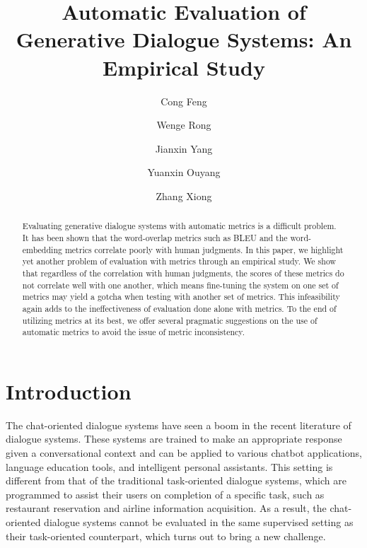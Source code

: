 \documentclass[runningheads]{llncs}
\begin{document}
    \title{Automatic Evaluation of Generative Dialogue Systems: An Empirical Study}
    \author{Cong Feng \and Wenge Rong \and Jianxin Yang  \and Yuanxin Ouyang  \and Zhang Xiong }

    \maketitle

    \begin{abstract}
        Evaluating generative dialogue systems with automatic metrics is a difficult problem. It has been shown that the word-overlap metrics such as BLEU and the word-embedding metrics correlate poorly with human judgments. In this paper, we highlight yet another problem of evaluation with metrics through an empirical study. We show that regardless of the correlation with human judgments, the scores of these metrics do not correlate well with one another, which means fine-tuning the system on one set of metrics may yield a gotcha when testing with another set of metrics. This infeasibility again adds to the ineffectiveness of evaluation done alone with metrics. To the end of utilizing metrics at its best, we offer several pragmatic suggestions on the use of automatic metrics to avoid the issue of metric inconsistency.
    \end{abstract}

    \section{Introduction}
    The chat-oriented dialogue systems have seen a boom in the recent literature of dialogue systems. These systems are trained to make an appropriate response given a conversational context and can be applied to various chatbot applications, language education tools, and intelligent personal assistants. This setting is different from that of the traditional task-oriented dialogue systems, which are programmed to assist their users on completion of a specific task, such as restaurant reservation and airline information acquisition. As a result, the chat-oriented dialogue systems cannot be evaluated in the same supervised setting as their task-oriented counterpart, which turns out to bring a new challenge.
\end{document}
